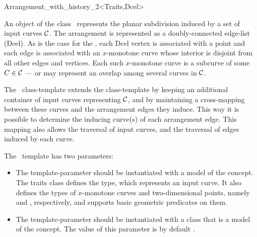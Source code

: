 
\ccRefPageBegin

\begin{ccRefClass}{Arrangement_with_history_2<Traits,Dcel>}
\label{arr_ref:arr_with_hist}
    
\ccDefinition

An object  of the class \ccClassTemplateName\ represents the
planar subdivision induced by a set of input curves ${\cal C}$.
The arrangement is represented as a doubly-connected edge-list ({\sc Dcel}).
As is the case for the , each {\sc Dcel}
vertex is associated with a point and each edge is associated with an
$x$-monotone curve whose interior is disjoint from all other edges and
vertices. Each such $x$-monotone curve is a subcurve of some 
$C \in {\cal C}$ --- or may represent an overlap among several curves
in ${\cal C}$.

The \ccClassTemplateName\ class-template extends the 
class-template by keeping an additional container of input curves 
representing ${\cal C}$, and by maintaining a cross-mapping between these
curves and the arrangement edges they induce. This way it is possible
to determine the inducing curve(s) of each arrangement edge. This mapping 
also allows the traversal of input curves, and the traversal of edges
induced by each curve.

The \ccClassTemplateName\ template has two parameters:
\begin{itemize}
\item The  template-parameter should be instantiated with
a model of the  concept. The traits
class defines the  type, which represents an input curve.
It also defines the types of $x$-monotone curves and two-dimensional
points, namely  and ,
respectively, and supports basic geometric predicates on them.
\item The  template-parameter should be instantiated with
a class that is a model of the  concept. The
value of this parameter is by default
.
\end{itemize}


\end{ccRefClass}
